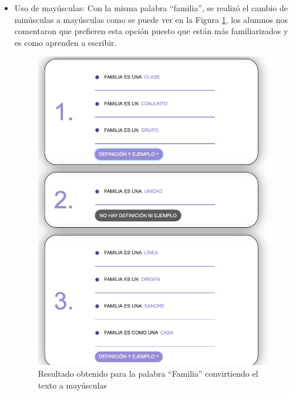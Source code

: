 \begin{itemize}
	\item  Uso de mayúsculas:  Con la misma palabra ``familia'', se realizó el cambio de minúsculas a mayúsculas como se puede ver en la Figura \ref{fig:familiaMayusculas}, los alumnos nos comentaron que prefieren esta opción puesto que están más familiarizados y es como aprenden a escribir.
	
	\begin{figure}[!h]
		\includegraphics[width=.7\textwidth]{Imagenes/Bitmap/Capitulo4/EvaluacionFinal/10familiamayusculas.png}
		\centering
		\caption{Resultado obtenido para la palabra ``Familia'' convirtiendo el texto a mayúsculas}
		\label{fig:familiaMayusculas}
	\end{figure}
	
\end{itemize}


